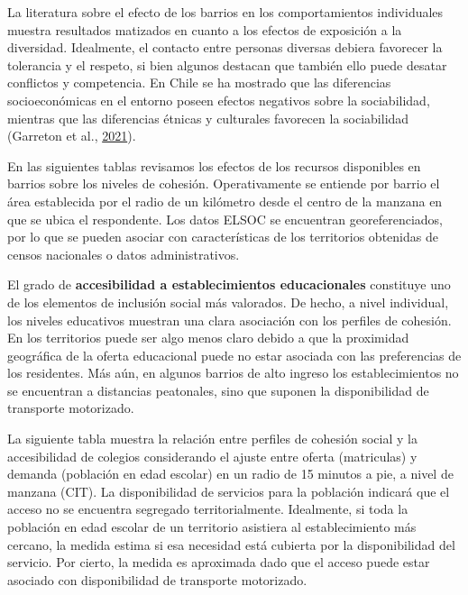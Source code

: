 \documentclass[
  12pt,
]{book}
\begin{document}
La literatura sobre el efecto de los barrios en los comportamientos individuales muestra resultados matizados en cuanto a los efectos de exposición a la diversidad. Idealmente, el contacto entre personas diversas debiera favorecer la tolerancia y el respeto, si bien algunos destacan que también ello puede desatar conflictos y competencia. En Chile se ha mostrado que las diferencias socioeconómicas en el entorno poseen efectos negativos sobre la sociabilidad, mientras que las diferencias étnicas y culturales favorecen la sociabilidad (Garreton et al., \protect\hyperlink{ref-garreton_social_2021}{2021}).

En las siguientes tablas revisamos los efectos de los recursos disponibles en barrios sobre los niveles de cohesión. Operativamente se entiende por barrio el área establecida por el radio de un kilómetro desde el centro de la manzana en que se ubica el respondente. Los datos ELSOC se encuentran georeferenciados, por lo que se pueden asociar con características de los territorios obtenidas de censos nacionales o datos administrativos.

El grado de \textbf{accesibilidad a establecimientos educacionales} constituye uno de los elementos de inclusión social más valorados. De hecho, a nivel individual, los niveles educativos muestran una clara asociación con los perfiles de cohesión. En los territorios puede ser algo menos claro debido a que la proximidad geográfica de la oferta educacional puede no estar asociada con las preferencias de los residentes. Más aún, en algunos barrios de alto ingreso los establecimientos no se encuentran a distancias peatonales, sino que suponen la disponibilidad de transporte motorizado.

La siguiente tabla muestra la relación entre perfiles de cohesión social y la accesibilidad de colegios considerando el ajuste entre oferta (matriculas) y demanda (población en edad escolar) en un radio de 15 minutos a pie, a nivel de manzana (CIT). La disponibilidad de servicios para la población indicará que el acceso no se encuentra segregado territorialmente. Idealmente, si toda la población en edad escolar de un territorio asistiera al establecimiento más cercano, la medida estima si esa necesidad está cubierta por la disponibilidad del servicio. Por cierto, la medida es aproximada dado que el acceso puede estar asociado con disponibilidad de transporte motorizado.
\end{document}
